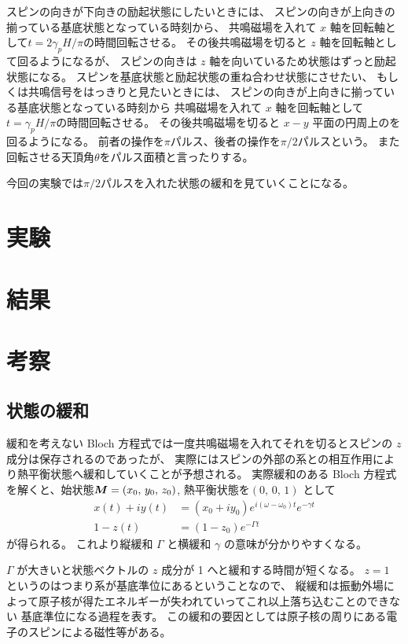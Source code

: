 \documentclass[11pt,dvipdfmx,a4paper]{jsarticle}
\begin{document}
スピンの向きが下向きの励起状態にしたいときには、
スピンの向きが上向きの揃っている基底状態となっている時刻から、
共鳴磁場を入れて \(x\) 軸を回転軸として\(t=2\gamma_pH/\pi\)の時間回転させる。
その後共鳴磁場を切ると \(z\) 軸を回転軸として回るようになるが、
スピンの向きは \(z\) 軸を向いているため状態はずっと励起状態になる。
スピンを基底状態と励起状態の重ね合わせ状態にさせたい、
もしくは共鳴信号をはっきりと見たいときには、
スピンの向きが上向きに揃っている基底状態となっている時刻から
共鳴磁場を入れて \(x\) 軸を回転軸として\(t=\gamma_pH/\pi\)の時間回転させる。
その後共鳴磁場を切ると \(x-y\) 平面の円周上のを回るようになる。
前者の操作を\(\pi\)パルス、後者の操作を\(\pi/2\)パルスという。
また回転させる天頂角\(\theta\)をパルス面積と言ったりする。

今回の実験では\(\pi/2\)パルスを入れた状態の緩和を見ていくことになる。

\section{実験}

\section{結果}

\section{考察}
\subsection{状態の緩和}
緩和を考えない Bloch 方程式では一度共鳴磁場を入れてそれを切るとスピンの \(z\) 成分は保存されるのであったが、
実際にはスピンの外部の系との相互作用により熱平衡状態へ緩和していくことが予想される。
実際緩和のある Bloch 方程式を解くと、始状態\(\vb*{M}=\qty(x_0,\,y_0,\,z_0)\), 熱平衡状態を\((0,\,0,\,1)\)
として
\begin{align}
	x(t) + iy(t) &= (x_0 + iy_0) e^{i(\omega-\omega_0)t}e^{-\gamma t}\\
	1 - z(t) &= (1- z_0) e^{-\Gamma t}
\end{align}
が得られる。
これより縦緩和 \(\Gamma\) と横緩和 \(\gamma\) の意味が分かりやすくなる。

\(\Gamma\) が大きいと状態ベクトルの \(z\) 成分が 1 へと緩和する時間が短くなる。
\(z=1\) というのはつまり系が基底準位にあるということなので、
縦緩和は振動外場によって原子核が得たエネルギーが失われていってこれ以上落ち込むことのできない
基底準位になる過程を表す。
この緩和の要因としては原子核の周りにある電子のスピンによる磁性等がある。
\end{document}

